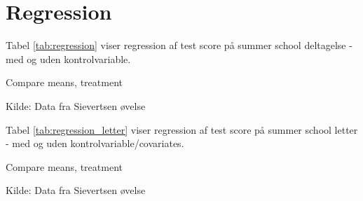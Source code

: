 \documentclass[12pt]{article}
\begin{document}
\section*{Regression}

Tabel \ref{tab:regression} viser regression af test score på summer school deltagelse - med og uden kontrolvariable.


\begin{table}[h] \centering
	\begin{threeparttable} 
		\caption{Compare means, treatment} \label{tab:regression}
			
		\begin{tablenotes}
            \item Kilde: Data fra Sievertsen øvelse
        \end{tablenotes}
	\end{threeparttable}
\end{table}

Tabel \ref{tab:regression_letter} viser regression af test score på summer school letter - med og uden kontrolvariable/covariates.


\begin{table}[h] \centering
	\begin{threeparttable} 
		\caption{Compare means, treatment} \label{tab:regression_letter}
			
		\begin{tablenotes}
            \item Kilde: Data fra Sievertsen øvelse
        \end{tablenotes}
	\end{threeparttable}
\end{table}

\end{document}
